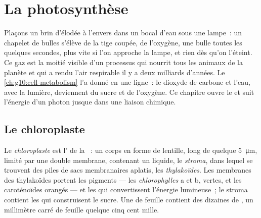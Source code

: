\chapter{La photosynthèse}\label{ch:g12:photosynthesis}

Plaçons un brin d'élodée à l'envers dans un bocal d'eau sous une
lampe~: un chapelet de bulles s'élève de la tige coupée, de
l'oxygène, une bulle toutes les quelques secondes, plus vite si l'on
approche la lampe, et rien dès qu'on l'éteint. Ce gaz est la moitié
visible d'un processus qui nourrit tous les animaux de la planète et
qui a rendu l'air respirable il y a deux milliards d'années. Le
\cref{ch:g10:cell-metabolism} l'a donné en une ligne~: le dioxyde de
carbone et l'eau, avec la lumière, deviennent du sucre et de
l'oxygène. Ce chapitre ouvre le  et suit l'énergie d'un
photon jusque dans une liaison chimique.

\section{Le chloroplaste}

\begin{definition}[Chloroplaste]\label{def:g12:photosynthesis:chloroplast}
Le \emph{chloroplaste} est l' de la
~: un corps en forme de lentille, long de quelque
\qty{5}{\micro m}, limité par une double membrane, contenant un
liquide, le \emph{stroma}, dans lequel se trouvent des piles de sacs
membranaires aplatis, les \emph{thylakoïdes}. Les
membranes des thylakoïdes portent les pigments --- les
\emph{chlorophylles} a et b, vertes, et les caroténoïdes orangés ---
et les  qui convertissent l'énergie lumineuse~; le stroma
contient les  qui construisent le sucre. Une  de feuille
contient des dizaines de , un millimètre carré de feuille
quelque cinq cent mille.
\end{definition}

